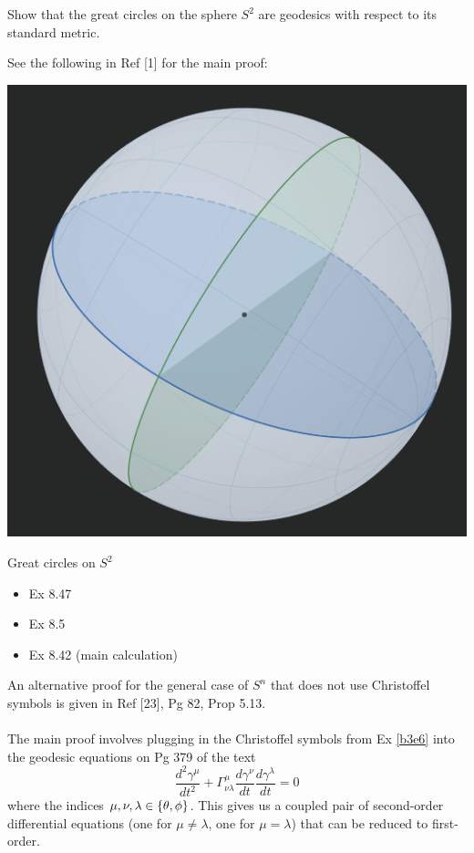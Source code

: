 \documentclass[10pt]{article}
\begin{document}
\begin{example}
	Show that the great circles on the sphere $S^2$ are geodesics with respect to its standard metric.
\end{example}
\sol See the following in Ref [1] for the main proof:
\begin{marginfigure}
	\begin{center}
	  \includegraphics[width=1.2\textwidth]{figs/great_circ.png}
	\end{center}
	\caption{Great circles on $S^2$}
\end{marginfigure}
\begin{itemize}
	\item Ex 8.47
	\item Ex 8.5
	\item Ex 8.42 (main calculation)
\end{itemize}
An alternative proof for the general case of $S^n$ that does not use Christoffel symbols is given in Ref [23], Pg 82, Prop 5.13.\\\\
The main proof involves plugging in the Christoffel symbols from Ex \ref{b3e6} into the geodesic equations on Pg 379 of the text
$$
\frac{d^2\gamma^\mu}{dt^2}+\Gamma_{\nu\lambda}^\mu\frac{d\gamma^\nu}{dt}\frac{d\gamma^\lambda}{dt}=0
$$
where the indices $\mu,\nu,\lambda \in \lbrace\theta,\phi\rbrace$. This gives us a coupled pair of second-order differential equations (one for $\mu\ne\lambda$, one for $\mu=\lambda$) that can be reduced to first-order.\\\\
\end{document}
